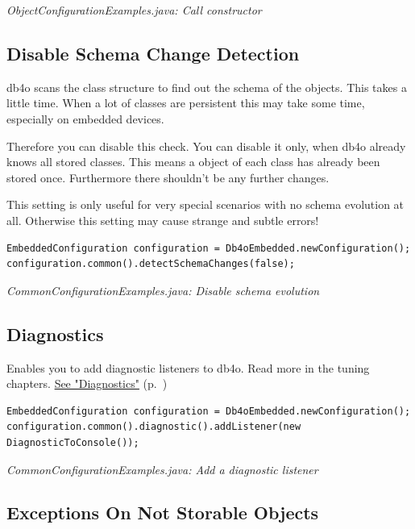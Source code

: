 {\small\itshape ObjectConfigurationExamples.java: Call constructor\par}
\medskip

\subsection{Disable Schema Change Detection}
\label{ref:configuration-common-no-schema-changes}

db4o scans the class structure to find out the schema of the objects. This takes a little time. When a lot of classes are persistent this may take some time, especially on embedded devices.

Therefore you can disable this check. You can disable it only, when db4o already knows all stored classes. This means a object of each class has already been stored once. Furthermore there shouldn't be any further changes.

This setting is only useful for very special scenarios with no schema evolution at all. Otherwise this setting may cause strange and subtle errors!

\begin{lstlisting}
EmbeddedConfiguration configuration = Db4oEmbedded.newConfiguration();
configuration.common().detectSchemaChanges(false);
\end{lstlisting}

{\small\itshape CommonConfigurationExamples.java: Disable schema evolution\par}
\medskip

\subsection{Diagnostics}
\label{ref:configuration-common-diagnostics}

Enables you to add diagnostic listeners to db4o. Read more in the tuning chapters. \hyperref[ref:advanced-topics-diagnostics]{See "Diagnostics"} (p.~\pageref{ref:advanced-topics-diagnostics})

\begin{lstlisting}
EmbeddedConfiguration configuration = Db4oEmbedded.newConfiguration();
configuration.common().diagnostic().addListener(new DiagnosticToConsole());
\end{lstlisting}

{\small\itshape CommonConfigurationExamples.java: Add a diagnostic listener\par}
\medskip

\subsection{Exceptions On Not Storable Objects}
\label{ref:configuration-common-exceptionsonnotstorable}

